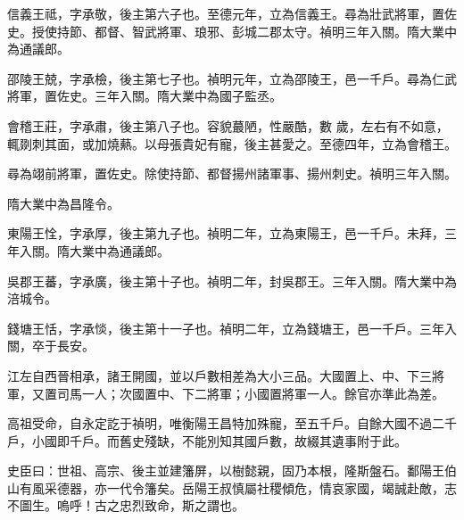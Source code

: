 \begin{pinyinscope}
 信義王祗，字承敬，後主第六子也。至德元年，立為信義王。尋為壯武將軍，置佐史。授使持節、都督、智武將軍、琅邪、彭城二郡太守。禎明三年入關。隋大業中為通議郎。



 邵陵王兢，字承檢，後主第七子也。禎明元年，立為邵陵王，邑一千戶。尋為仁武將軍，置佐史。三年入關。隋大業中為國子監丞。



 會稽王莊，字承肅，後主第八子也。容貌蕞陋，性嚴酷，數
 歲，左右有不如意，輒剟刺其面，或加燒爇。以母張貴妃有寵，後主甚愛之。至德四年，立為會稽王。



 尋為翊前將軍，置佐史。除使持節、都督揚州諸軍事、揚州刺史。禎明三年入關。



 隋大業中為昌隆令。



 東陽王恮，字承厚，後主第九子也。禎明二年，立為東陽王，邑一千戶。未拜，三年入關。隋大業中為通議郎。



 吳郡王蕃，字承廣，後主第十子也。禎明二年，封吳郡王。三年入關。隋大業中為涪城令。



 錢塘王恬，字承惔，後主第十一子也。禎明二年，立為錢塘王，邑一千戶。三年入關，卒于長安。



 江左自西晉相承，諸王開國，並以戶數相差為大小三品。大國置上、中、下三將軍，又置司馬一人；次國置中、下二將軍；小國置將軍一人。餘官亦準此為差。



 高祖受命，自永定訖于禎明，唯衡陽王昌特加殊寵，至五千戶。自餘大國不過二千戶，小國即千戶。而舊史殘缺，不能別知其國戶數，故綴其遺事附于此。



 史臣曰：世祖、高宗、後主並建籓屏，以樹懿親，固乃本根，隆斯盤石。鄱陽王伯山有風采德器，亦一代令籓矣。岳陽王叔慎屬社稷傾危，情哀家國，竭誠赴敵，志不圖生。嗚呼！古之忠烈致命，斯之謂也。



\end{pinyinscope}